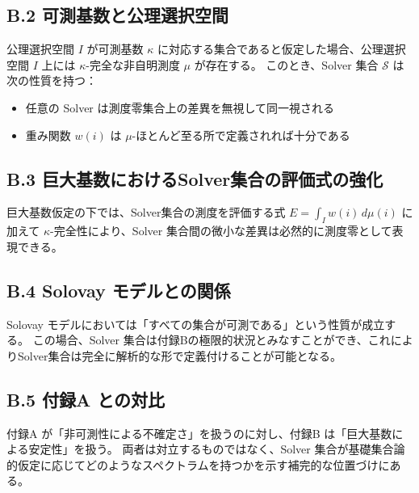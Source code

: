 \documentclass[12pt,a4paper]{article}
\begin{document}
\subsection{B.2 可測基数と公理選択空間}
公理選択空間 $I$ が可測基数 $\kappa$ に対応する集合であると仮定した場合、公理選択空間 $I$ 上には $\kappa$-完全な非自明測度 $\mu$ が存在する。
このとき、Solver 集合 $\mathcal{S}$ は次の性質を持つ：

\begin{itemize}
  \item 任意の Solver は測度零集合上の差異を無視して同一視される
  \item 重み関数 $w(i)$ は $\mu$-ほとんど至る所で定義されれば十分である
\end{itemize}

\subsection{B.3 巨大基数におけるSolver集合の評価式の強化}
巨大基数仮定の下では、Solver集合の測度を評価する式 $E = \int_I w(i)\, d\mu(i)$ に加えて $\kappa$-完全性により、Solver 集合間の微小な差異は必然的に測度零として表現できる。

\subsection{B.4 Solovay モデルとの関係}
Solovay モデルにおいては「すべての集合が可測である」という性質が成立する。
この場合、Solver 集合は付録Bの極限的状況とみなすことができ、これによりSolver集合は完全に解析的な形で定義付けることが可能となる。

\subsection{B.5 付録A との対比}
付録A が「非可測性による不確定さ」を扱うのに対し、付録B は「巨大基数による安定性」を扱う。
両者は対立するものではなく、Solver 集合が基礎集合論的仮定に応じてどのようなスペクトラムを持つかを示す補完的な位置づけにある。
\end{document}
